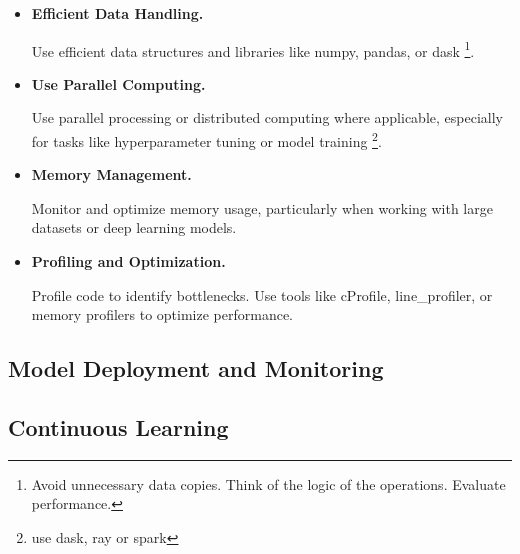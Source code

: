 \begin{itemize}
    \item \textbf{Efficient Data Handling.}
    
    \noindent
    Use efficient data structures and libraries like numpy, pandas,
    or dask
    \footnote{
        Avoid unnecessary data copies. Think of the logic of the
        operations. Evaluate performance.
    }.


    \item \textbf{Use Parallel Computing.}
    
    \noindent
    Use parallel processing or distributed computing where
    applicable, especially for tasks like hyperparameter tuning
    or model training
    \footnote{
        use dask, ray or spark
    }.


    \item \textbf{Memory Management.}
    
    \noindent
    Monitor and optimize memory usage, particularly when working
    with large datasets or deep learning models.


    \item \textbf{Profiling and Optimization.}
    
    \noindent
    Profile code to identify bottlenecks. Use tools like cProfile,
    line\_profiler, or memory profilers to optimize performance.


\end{itemize}










\subsection{Model Deployment and Monitoring}










\subsection{Continuous Learning}






